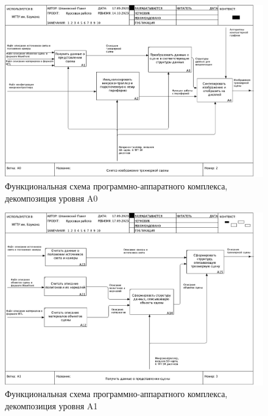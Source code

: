 \begin{figure}[H]
	\centering
	\includegraphics[height=0.45\textheight]{inc/img/02_A0.pdf}
	\caption{Функциональная схема программно-аппаратного комплекса, декомпозиция уровня A0}
	\label{fig:a02}
\end{figure}

\begin{figure}[H]
	\centering
	\includegraphics[height=0.45\textheight]{inc/img/03_A1.pdf}
	\caption{Функциональная схема программно-аппаратного комплекса, декомпозиция уровня A1}
	\label{fig:a1}
\end{figure}

